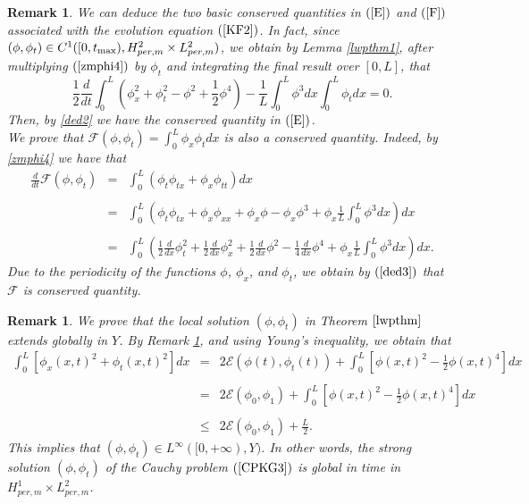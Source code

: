 \documentclass[12pt,reqno,a4paper]{amsart} %
\numberwithin{equation}{section}
\numberwithin{figure}{section}
\newtheorem{remark}[theorem]{Remark}
\begin{document}
\begin{remark}\label{cqEF} We can deduce the two basic conserved quantities in $(\ref{E})$ and $(\ref{F})$ associated with the evolution equation $(\ref{KF2})$. In fact, since $(\phi, \phi_t)\in C^1([0,t_{\rm{max}}),H_{per,m}^2\times L_{per,m}^2)$, we obtain by Lemma \ref{lwpthm1}, after multiplying $(\ref{zmphi4})$ by $\phi_t$ and integrating the final result over $[0,L]$, that
\begin{equation}\label{ded2}
\frac{1}{2}\frac{d}{dt}\int_0^L\left(  \phi_x^2+\phi_t^2-\phi ^2 +\frac{1}{2}\phi^4\right)-\frac{1}{L}\int_0^L\phi^3dx\int_{0}^{L}\phi_tdx=0. 
\end{equation}
 Then, by \eqref{ded2} we have the conserved quantity in $(\ref{E})$. \\
\indent We prove that $\mathcal{F}(\phi,\phi_t)=\displaystyle\int_{0}^{L}\phi_x\phi_t dx$ is also a conserved quantity. Indeed, by \eqref{zmphi4} we have that 
\begin{equation}\label{ded3}\begin{array}{llll}
	\displaystyle\frac{d}{dt}\mathcal{F}(\phi,\phi_t)&=& \displaystyle\int_{0}^{L}(\phi_t \phi_{tx}+ \phi_x \phi_{tt}) dx \\\\ &= &\displaystyle\int_{0}^{L}\left(\phi_t \phi_{tx}+ \phi_x \phi_{xx}+\phi_x \phi-\phi_x \phi^3+\phi_x\frac{1}{L}\int_0^L\phi^3dx\right) dx \\\\ &= &\displaystyle\int_{0}^{L}\left(\frac{1}{2}\frac{d}{dx} \phi_t ^2
	+ \frac{1}{2}\frac{d}{dx} \phi_x ^2+\frac{1}{2}\frac{d}{dx} \phi ^2-\frac{1}{4}\frac{d}{dx} \phi ^4+\phi_x\frac{1}{L}\int_0^L\phi^3dx\right)dx.
\end{array}\end{equation}
Due to the periodicity of the functions $\phi$, $\phi_x$, and $\phi_t$, we obtain by $(\ref{ded3})$ that $\mathcal{F}$ is conserved quantity.
\end{remark}
 
 \begin{remark}\label{gwp}
  We prove that the local solution 
 $(\phi,\phi_t)$ in Theorem $\ref{lwpthm}$ extends globally in $Y$. By Remark \ref{cqEF}, and using Young’s inequality, we obtain that
 \begin{equation}\label{est2}\begin{array}{lllll}
 		\displaystyle\int_0^L[\phi_x(x,t)^2+\phi_t(x,t)^2]dx&=&2\mathcal{E}(\phi(t),\phi_t(t))+\displaystyle\int_0^L\left[\phi (x,t)^2 -\frac{1}{2}\phi(x,t)^4\right]dx\\\\
 		&=&2\mathcal{E}(\phi_0,\phi_1)+\displaystyle\int_0^L\left[\phi (x,t)^2 -\frac{1}{2}\phi(x,t)^4\right]dx \\\\
 		 &\leq &2\displaystyle\mathcal{E}(\phi_0,\phi_1)+\frac{L}{2}.
 	\end{array}
 \end{equation}
 This implies that $(\phi,\phi_t)\in L^{\infty}([0,+\infty),Y)$. In other words, the strong solution $(\phi,\phi_t)$ of the Cauchy problem $(\ref{CPKG3})$ is global in time in $H_{per,m}^1\times L_{per,m}^2$. 
  \end{remark}
 
\end{document}
